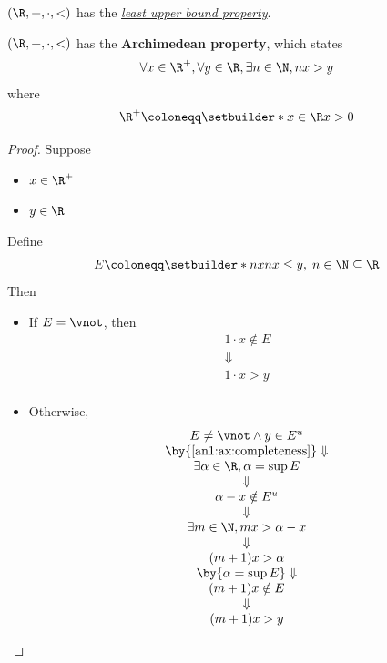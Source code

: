 \begin{axiom} \label{an1:ax:completeness}
  $(\R, +, \cdot, <)$ has the \hyperref[an1:def:least-upper-bound-property]{\emph{least upper bound property}}.
\end{axiom}

\begin{theorem} \label{an1:thm:archimedean-property}
  $(\R, +, \cdot, <)$ has the \textbf{Archimedean property}, which states
  \[
    \forall x \in \R^{+}, \forall y \in \R, \exists n \in \N, nx > y
  \]
  where
  \[
    \R^{+} \coloneqq \setbuilder*{x \in \R}{x > 0}
  \]
\end{theorem}

\begin{proof}
  Suppose
  \begin{itemize}
    \item $x \in \R^{+}$
    \item $y \in \R$
  \end{itemize}
  Define
  \[
    E \coloneqq \setbuilder*{nx}{nx \leq y, \; n \in \N} \subseteq \R
  \]
  Then
  \begin{itemize}
    \item If $E = \vnot$, then
          \[
            \begin{array}{c}
              1 \cdot x \notin E \\
              \Downarrow         \\
              1 \cdot x > y      \\
            \end{array}
          \]
    \item Otherwise,
          \[
            \begin{array}{c}
              E \neq \vnot \land y \in E^{u}               \\
              \by{\Cref{an1:ax:completeness}} \Downarrow   \\
              \exists \alpha \in \R, \alpha = \sup E       \\
              \Downarrow                                   \\
              \alpha - x \notin E^{u}                      \\
              \Downarrow                                   \\
              \exists m \in \N, mx > \alpha - x            \\
              \Downarrow                                   \\
              (m + 1)x > \alpha                            \\
              \by{\ensuremath{\alpha = \sup E}} \Downarrow \\
              (m + 1)x \notin E                            \\
              \Downarrow                                   \\
              (m + 1)x > y
            \end{array}
          \]
  \end{itemize}
\end{proof}

